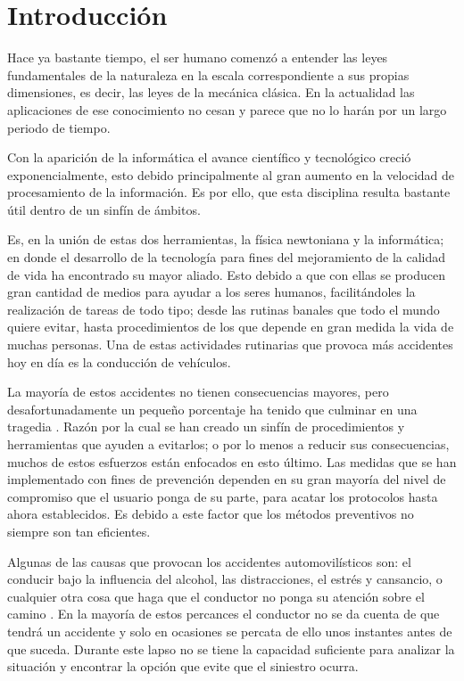 \chapter{Introducción}
\pagestyle{fancy} %
\setcounter{page}{1}

Hace ya bastante tiempo, el ser humano comenzó a entender las leyes fundamentales de la naturaleza en la escala correspondiente a sus propias dimensiones, es decir, las leyes de la mecánica clásica. 
En la actualidad las aplicaciones de ese conocimiento no cesan y parece que no lo harán por un largo periodo de tiempo.

Con la aparición de la informática el avance científico y tecnológico creció exponencialmente, esto debido principalmente al gran aumento en la velocidad de procesamiento de la información. 
Es por ello, que esta disciplina resulta bastante útil dentro de un sinfín de ámbitos.

Es, en la unión de estas dos herramientas, la física newtoniana y la informática; en donde el desarrollo de la tecnología para fines del mejoramiento de la calidad de vida ha encontrado su mayor aliado. 
Esto debido a que con ellas se producen gran cantidad de medios para ayudar a los seres humanos, facilitándoles la realización de tareas de todo tipo; desde las rutinas banales que todo el mundo quiere evitar, hasta procedimientos de los que depende en gran medida la vida de muchas personas.
Una de estas actividades rutinarias que provoca más accidentes hoy en día es la conducción de vehículos.
 
La mayoría de estos accidentes no tienen consecuencias mayores, pero desafortunadamente un pequeño porcentaje ha tenido que culminar en una tragedia \cite{book1}.
Razón por la cual se han creado un sinfín de procedimientos y herramientas que ayuden a evitarlos; o por lo menos a reducir sus consecuencias, 
muchos de estos esfuerzos están enfocados en esto último. 
Las medidas que se han implementado con fines de prevención dependen en su gran mayoría del nivel de compromiso que el usuario ponga de su parte, para acatar los protocolos hasta ahora establecidos. 
Es debido a este factor que los métodos preventivos no siempre son tan eficientes. 

Algunas de las causas que provocan los accidentes automovilísticos son: el conducir bajo la influencia del alcohol, las distracciones, el estrés y cansancio, o cualquier otra cosa que haga que el conductor no ponga su atención sobre el camino \cite{book1}.
En la mayoría de estos percances el conductor no se da cuenta de que tendrá un accidente y solo en ocasiones se percata de ello unos instantes antes de que suceda. 
Durante este lapso no se tiene la capacidad suficiente para analizar la situación y encontrar la opción que evite que el siniestro ocurra. 


